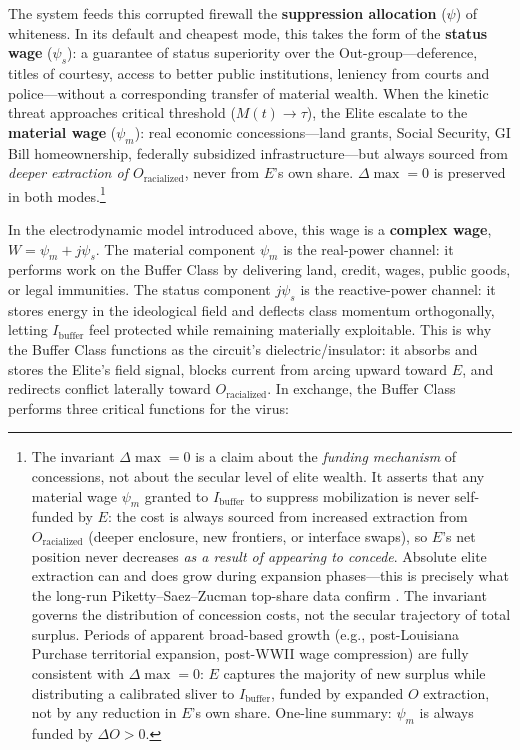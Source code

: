 The system feeds this corrupted firewall the \textbf{suppression allocation} ($\psi$) of whiteness. In its default and cheapest mode, this takes the form of the \textbf{status wage} ($\psi_s$): a guarantee of status superiority over the Out-group---deference, titles of courtesy, access to better public institutions, leniency from courts and police---without a corresponding transfer of material wealth. When the kinetic threat approaches critical threshold ($M(t) \to \tau$), the Elite escalate to the \textbf{material wage} ($\psi_m$): real economic concessions---land grants, Social Security, GI Bill homeownership, federally subsidized infrastructure---but always sourced from \textit{deeper extraction of $O_{\text{racialized}}$}, never from $E$'s own share. $\Delta\max = 0$ is preserved in both modes.\footnote{The invariant $\Delta\max = 0$ is a claim about the \textit{funding mechanism} of concessions, not about the secular level of elite wealth. It asserts that any material wage $\psi_m$ granted to $I_{\text{buffer}}$ to suppress mobilization is never self-funded by $E$: the cost is always sourced from increased extraction from $O_{\text{racialized}}$ (deeper enclosure, new frontiers, or interface swaps), so $E$'s net position never decreases \textit{as a result of appearing to concede}. Absolute elite extraction can and does grow during expansion phases---this is precisely what the long-run Piketty--Saez--Zucman top-share data confirm \cite{piketty}. The invariant governs the distribution of concession costs, not the secular trajectory of total surplus. Periods of apparent broad-based growth (e.g., post-Louisiana Purchase territorial expansion, post-WWII wage compression) are fully consistent with $\Delta\max = 0$: $E$ captures the majority of new surplus while distributing a calibrated sliver to $I_{\text{buffer}}$, funded by expanded $O$ extraction, not by any reduction in $E$'s own share. One-line summary: $\psi_m$ is always funded by $\Delta O > 0$.}

In the electrodynamic model introduced above, this wage is a \textbf{complex wage}, $W = \psi_m + j\psi_s$. The material component $\psi_m$ is the real-power channel: it performs work on the Buffer Class by delivering land, credit, wages, public goods, or legal immunities. The status component $j\psi_s$ is the reactive-power channel: it stores energy in the ideological field and deflects class momentum orthogonally, letting $I_{\text{buffer}}$ feel protected while remaining materially exploitable. This is why the Buffer Class functions as the circuit's dielectric/insulator: it absorbs and stores the Elite's field signal, blocks current from arcing upward toward $E$, and redirects conflict laterally toward $O_{\text{racialized}}$. In exchange, the Buffer Class performs three critical functions for the virus:

